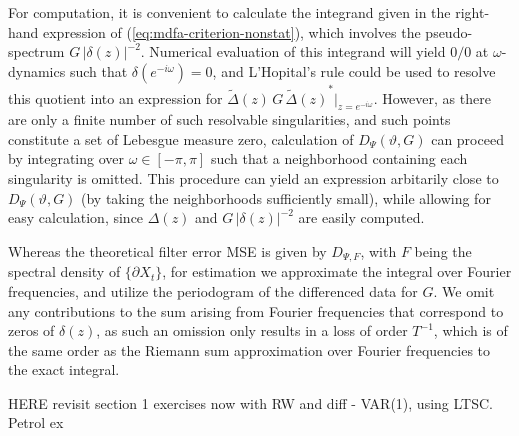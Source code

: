 \documentclass[a4paper]{book}
\begin{document}
 For computation, it is convenient to calculate the integrand given in the
  right-hand expression of (\ref{eq:mdfa-criterion-nonstat}), which involves
   the pseudo-spectrum $ G \, {|\delta (z) |}^{-2}$.  Numerical
    evaluation of this integrand will yield $0/0$ at $\omega$-dynamics such
  that $\delta (e^{-i \omega}) = 0$, and L'Hopital's rule could be used
  to resolve this quotient into an expression for
  $\widetilde{\Delta} (z)   \,  G \,  {\widetilde{\Delta} (z) }^* \vert_{z= e^{-i \omega}}$.
  However, as there are only a finite number of such resolvable singularities,
   and such points constitute a set of   Lebesgue measure zero, 
   calculation of $D_{\Psi} (\vartheta, G)$ can proceed by 
   integrating over $\omega \in [-\pi, \pi]$ such that a neighborhood containing
    each singularity is omitted.  This procedure can yield an expression arbitarily
     close to $D_{\Psi} (\vartheta, G)$ (by taking the neighborhoods sufficiently small),
    while allowing for easy calculation, since $\Delta (z)$ and 
    $ G \, {|\delta (z) |}^{-2}$ are easily computed.  
   
   
  Whereas the theoretical filter error MSE is given by $D_{\Psi, F}$, 
  with $F$ being the spectral density of $\{ \partial X_t \}$,
 for estimation we approximate the integral over Fourier frequencies, 
 and utilize the periodogram of the differenced data for $G$.
 We omit any contributions to the sum arising from Fourier frequencies
 that correspond to zeros of $\delta (z)$, as such an omission
 only results in a loss of order $T^{-1}$, which is of the same order
 as the Riemann sum approximation over Fourier frequencies to the exact integral.




HERE revisit section 1 exercises now with RW and diff - VAR(1), using LTSC.  Petrol ex
\end{document}
